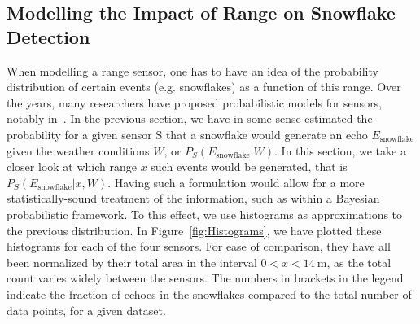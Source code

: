 \subsection{Modelling the Impact of Range on Snowflake Detection}
When modelling a range sensor, one has to have an idea of the probability distribution of certain events (e.g. snowflakes) as a function of this range. Over the years, many researchers have proposed probabilistic models for sensors, notably in~\cite{thrun2002probabilistic}. In the previous section, we have in some sense estimated the probability for a given sensor S that a snowflake would generate an echo $E_\text{snowflake}$ given the weather conditions $W$, or $P_S(E_\text{snowflake}|W)$. In this section, we take a closer look at which range $x$ such events would be generated, that is $P_S(E_\text{snowflake}|x,W)$. Having such a formulation would allow for a more statistically-sound treatment of the information, such as within a Bayesian probabilistic framework. To this effect, we use histograms as approximations to the previous distribution. In Figure~\ref{fig:Histograms}, we have plotted these histograms for each of the four sensors. For ease of comparison, they have all been normalized by their total area in the interval $0 < x < \SI{14}{\meter}$, as the total count varies widely between the sensors. The numbers in brackets in the legend indicate the fraction of echoes in the snowflakes compared to the total number of data points, for a given dataset.


